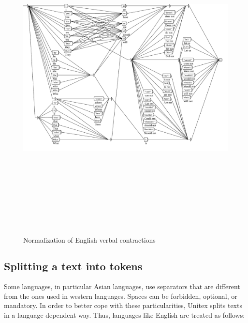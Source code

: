 \begin{figure}[!p]
\begin{center}
\includegraphics[height=17cm,angle=90]{resources/img/fig2-11.pdf}
\caption{Normalization of English verbal
contractions\label{fig-normalization-grammar}}
\end{center}
\end{figure}



\subsection{Splitting a text into tokens}
\label{tokenization}
Some languages, in particular Asian languages, use separators that are different
from the ones used in  western languages. Spaces can be forbidden, optional, or
mandatory. In order to better cope with these particularities,  Unitex splits
texts in a language dependent way. Thus, languages like English are treated as
follows:

